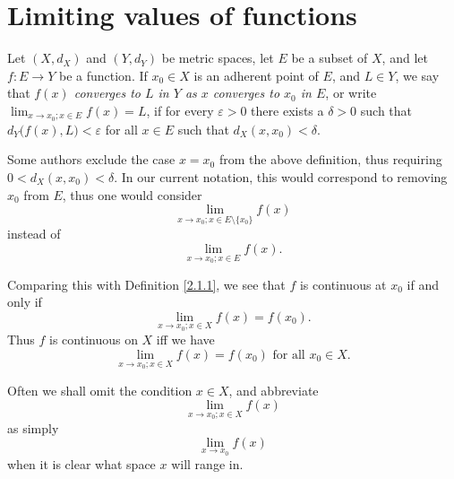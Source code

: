 \section{Limiting values of functions}\label{sec 3.1}

\begin{definition}\label{3.1.1}
    Let \((X, d_X)\) and \((Y, d_Y)\) be metric spaces, let \(E\) be a subset of \(X\), and let \(f : E \to Y\) be a function.
    If \(x_0 \in X\) is an adherent point of \(E\), and \(L \in Y\), we say that \emph{\(f(x)\) converges to \(L\) in \(Y\) as \(x\) converges to \(x_0\) in \(E\)}, or write \(\lim_{x \to x_0 ; x \in E} f(x) = L\), if for every \(\varepsilon > 0\) there exists a \(\delta > 0\) such that \(d_Y\big(f(x), L\big) < \varepsilon\) for all \(x \in E\) such that \(d_X(x, x_0) < \delta\).
\end{definition}

\begin{remark}\label{3.1.2}
    Some authors exclude the case \(x = x_0\) from the above definition, thus requiring \(0 < d_X(x, x_0) < \delta\).
    In our current notation, this would correspond to removing \(x_0\) from \(E\), thus one would consider
    \[
        \lim_{x \to x_0 ; x \in E \setminus \{x_0\}} f(x)
    \]
    instead of
    \[
        \lim_{x \to x_0 ; x \in E} f(x).
    \]
\end{remark}

\begin{note}
    Comparing this with Definition \ref{2.1.1}, we see that \(f\) is continuous at \(x_0\) if and only if
    \[
        \lim_{x \to x_0 ; x \in X} f(x) = f(x_0).
    \]
    Thus \(f\) is continuous on \(X\) iff we have
    \[
        \lim_{x \to x_0 ; x \in X} f(x) = f(x_0) \text{ for all } x_0 \in X.
    \]
\end{note}

\setcounter{theorem}{3}
\begin{remark}\label{3.1.4}
    Often we shall omit the condition \(x \in X\), and abbreviate
    \[
        \lim_{x \to x_0 ; x \in X} f(x)
    \]
    as simply
    \[
        \lim_{x \to x_0} f(x)
    \]
    when it is clear what space \(x\) will range in.
\end{remark}


